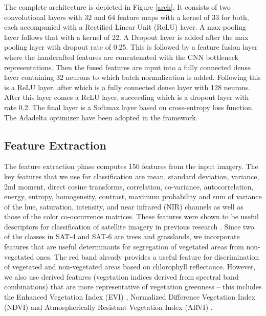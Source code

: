 \documentclass[]{interact}
\theoremstyle{plain}\newtheorem{theorem}{Theorem}[section]
\theoremstyle{definition}
\theoremstyle{remark}
\begin{document}
The complete architecture  is depicted in Figure \ref{arch}. It consists of  two convolutional layers with 32 and 64 feature maps with a kernel of 33 for both, each accompanied with a Rectified Linear Unit (ReLU) layer. A max-pooling layer follows that with a kernel of 22. A Dropout layer  is  added after the max pooling layer with dropout rate of  0.25. This is followed by a feature fusion layer where  the handcrafted features are concatenated with the  CNN bottleneck representations. Then the fused features are  input into a  fully connected dense  layer  containing 32  neurons to which batch normalization is added. Following this is a ReLU layer, after which is a fully connected dense layer with  128 neurons. After this layer comes a ReLU layer,   succeeding which is a   dropout layer with  rate   0.2.  The final layer is  a Softmax layer based on cross-entropy loss function. The Adadelta optimizer \citep{zeiler2012adadelta} have been adopted in the framework. 

\subsection{Feature Extraction}
The feature extraction phase computes 150 features from the input imagery.  The key features that we use for classification are mean, standard deviation, variance, 2nd moment, direct cosine transforms, correlation, co-variance, autocorrelation, energy, entropy, homogeneity, contrast, maximum probability and sum of variance of the hue, saturation, intensity, and near infrared (NIR) channels as well as those of the color co-occurrence matrices. These features were shown to be useful descriptors for classification of satellite imagery in previous research \citep{haralick1973}. Since two of the classes in SAT-4 and SAT-6 are trees and grasslands, we incorporate features that are useful determinants for segregation of vegetated areas from non-vegetated ones. The red band already provides a useful feature for discrimination of vegetated and non-vegetated areas based on chlorophyll reflectance.  However, we also use derived features (vegetation indices derived from spectral band combinations) that are more representative of vegetation greenness -- this includes the Enhanced Vegetation Index (EVI) \citep{huete2002}, Normalized Difference Vegetation Index (NDVI) \citep{rouse1974} and Atmospherically Resistant Vegetation Index (ARVI) \citep{kaufman1992}. 
\end{document}
